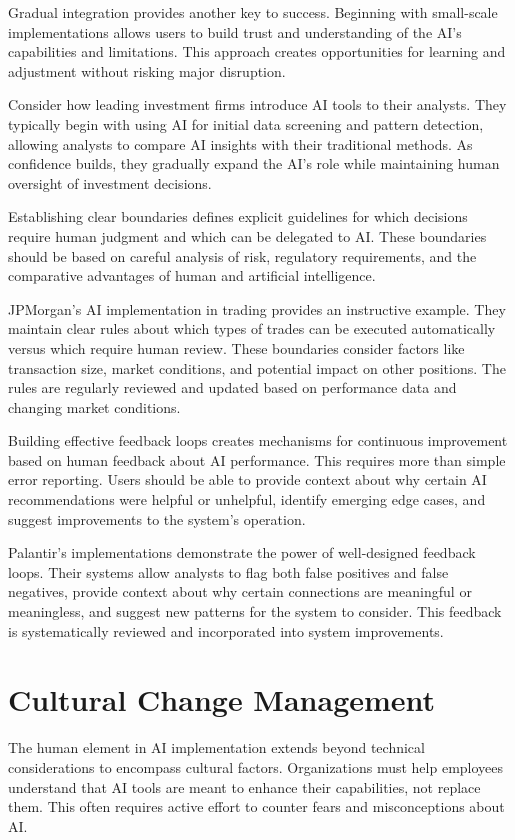 \documentclass[
  Letterpaper,
]{scrbook}
\begin{document}
Gradual integration provides another key to success. Beginning with
small-scale implementations allows users to build trust and
understanding of the AI's capabilities and limitations. This approach
creates opportunities for learning and adjustment without risking major
disruption.

Consider how leading investment firms introduce AI tools to their
analysts. They typically begin with using AI for initial data screening
and pattern detection, allowing analysts to compare AI insights with
their traditional methods. As confidence builds, they gradually expand
the AI's role while maintaining human oversight of investment decisions.

Establishing clear boundaries defines explicit guidelines for which
decisions require human judgment and which can be delegated to AI. These
boundaries should be based on careful analysis of risk, regulatory
requirements, and the comparative advantages of human and artificial
intelligence.

JPMorgan's AI implementation in trading provides an instructive example.
They maintain clear rules about which types of trades can be executed
automatically versus which require human review. These boundaries
consider factors like transaction size, market conditions, and potential
impact on other positions. The rules are regularly reviewed and updated
based on performance data and changing market conditions.

Building effective feedback loops creates mechanisms for continuous
improvement based on human feedback about AI performance. This requires
more than simple error reporting. Users should be able to provide
context about why certain AI recommendations were helpful or unhelpful,
identify emerging edge cases, and suggest improvements to the system's
operation.

Palantir's implementations demonstrate the power of well-designed
feedback loops. Their systems allow analysts to flag both false
positives and false negatives, provide context about why certain
connections are meaningful or meaningless, and suggest new patterns for
the system to consider. This feedback is systematically reviewed and
incorporated into system improvements.

\section{Cultural Change Management}\label{cultural-change-management}

The human element in AI implementation extends beyond technical
considerations to encompass cultural factors. Organizations must help
employees understand that AI tools are meant to enhance their
capabilities, not replace them. This often requires active effort to
counter fears and misconceptions about AI.
\end{document}
